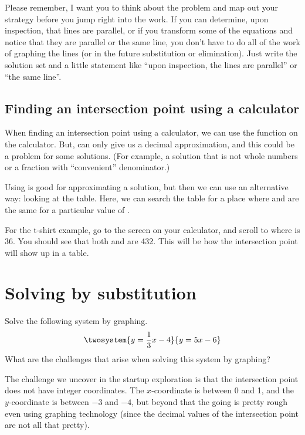 Please remember, I want you to think about the problem and map out your strategy before you jump right into the work. If you can determine, upon inspection, that lines are parallel, or if you transform some of the equations and notice that they are parallel or the same line, you don't have to do all of the work of graphing the lines (or in the future substitution or elimination). Just write the solution set and a little statement like ``upon inspection, the lines are parallel'' or ``the same line''.


\subsection{Finding an intersection point using a calculator}

When finding an intersection point using a calculator, we can use the  function on the calculator. But,  can only give us a decimal approximation, and this could be a problem for some solutions. (For example, a solution that is not whole numbers or a fraction with ``convenient'' denominator.)

Using  is good for approximating a solution, but then we can use an alternative way: looking at the table. Here, we can search the table for a place where  and  are the same for a particular value of .

For the t-shirt example, go to the  screen on your calculator, and scroll to where  is 36. You should see that both  and  are 432. This will be how the intersection point will show up in a table.


\section{Solving by substitution}
\label{sec:syssubstitution}

\begin{boxexplore}
Solve the following system by graphing.
\[\twosystem{y=\frac{1}{3}x-4}{y=5x-6}\]
What are the challenges that arise when solving this system by graphing?
\end{boxexplore}

The challenge we uncover in the startup exploration is that the intersection point does not have integer coordinates. The $x$-coordinate is between 0 and 1, and the $y$-coordinate is between $-3$ and $-4$, but beyond that the going is pretty rough even using graphing technology (since the decimal values of the intersection point are not all that pretty).


